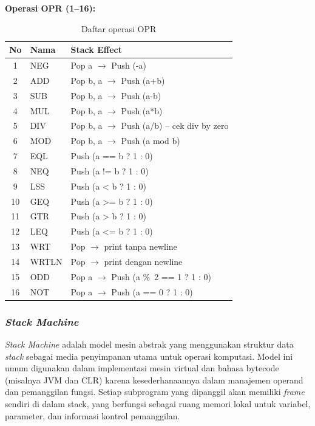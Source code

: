 \documentclass[12pt,a4paper]{article}
\begin{document}
\textbf{Operasi OPR (1--16):}

\begin{table}[H]
\centering
\caption{Daftar operasi OPR}
\begin{tabular}{cll}
\toprule
\textbf{No} & \textbf{Nama} & \textbf{Stack Effect} \\
\midrule
1  & NEG   & Pop a $\rightarrow$ Push (-a) \\
2  & ADD   & Pop b, a $\rightarrow$ Push (a+b) \\
3  & SUB   & Pop b, a $\rightarrow$ Push (a-b) \\
4  & MUL   & Pop b, a $\rightarrow$ Push (a*b) \\
5  & DIV   & Pop b, a $\rightarrow$ Push (a/b) -- cek div by zero \\
6  & MOD   & Pop b, a $\rightarrow$ Push (a mod b) \\
7  & EQL   & Push (a == b ? 1 : 0) \\
8  & NEQ   & Push (a != b ? 1 : 0) \\
9  & LSS   & Push (a < b ? 1 : 0) \\
10 & GEQ   & Push (a >= b ? 1 : 0) \\
11 & GTR   & Push (a > b ? 1 : 0) \\
12 & LEQ   & Push (a <= b ? 1 : 0) \\
13 & WRT   & Pop $\rightarrow$ print tanpa newline \\
14 & WRTLN & Pop $\rightarrow$ print dengan newline \\
15 & ODD   & Pop a $\rightarrow$ Push (a \%\ 2 == 1 ? 1 : 0) \\
16 & NOT   & Pop a $\rightarrow$ Push (a == 0 ? 1 : 0) \\
\bottomrule
\end{tabular}
\end{table}

\subsubsection{\textit{Stack Machine}}

\textit{Stack Machine} adalah model mesin abstrak yang menggunakan struktur
data \textit{stack} sebagai media penyimpanan utama untuk operasi komputasi.
Model ini umum digunakan dalam implementasi mesin virtual dan bahasa bytecode
(misalnya JVM dan CLR) karena kesederhanaannya dalam manajemen operand dan
pemanggilan fungsi. Setiap subprogram yang dipanggil akan memiliki \textit{frame}
sendiri di dalam stack, yang berfungsi sebagai ruang memori lokal untuk
variabel, parameter, dan informasi kontrol pemanggilan.
\end{document}
